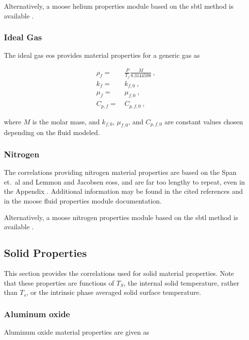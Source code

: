 \begin{appendices}
\noindent Alternatively, a \gls{moose} helium properties module based on the \gls{sbtl} method is available \cite{kunick}.

\subsubsection*{Ideal Gas}
The ideal gas \gls{eos} provides material properties for a generic gas as

\begin{subequations}
\begin{align}
\rho_f=&\ \frac{P}{T_f}\frac{M}{8.3144598}\ ,\\
k_f=&\ k_{f,0}\ ,\\
\mu_f=&\ \mu_{f,0}\ ,\\
C_{p,f}=&\ C_{p,f,0}\ ,
\end{align}
\end{subequations}

\noindent where \(M\) is the molar mass, and \(k_{f,0}\), \(\mu_{f,0}\), and \(C_{p,f,0}\) are constant values chosen depending on the fluid modeled.

\subsubsection*{Nitrogen}
The correlations providing nitrogen material properties are based on the Span et.\ al and Lemmon and Jacobsen \glspl{eos}, and are far too lengthy to repeat, even in the Appendix \cite{span,lemmon}. Additional information may be found in the cited references and in the \gls{moose} fluid properties module documentation.

Alternatively, a \gls{moose} nitrogen properties module based on the \gls{sbtl} method is available \cite{kunick}.

\subsection*{Solid Properties}

This section provides the correlations used for solid material properties. Note that these properties are functions of \(T_S\), the internal solid temperature, rather than \(T_s\), or the intrinsic phase averaged solid surface temperature. 

\subsubsection*{Aluminum oxide}
Aluminum oxide material properties are given as \cite{SANA,aluminum_oxide_cp}


\end{appendices}
